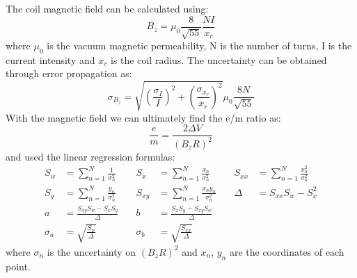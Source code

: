 The coil magnetic field can be calculated using:
\begin{equation*}
    B_z=\mu_0\frac{8}{\sqrt{55}}\frac{NI}{x_r}
\end{equation*}
where $\mu_0$ is the vacuum magnetic permeability, N is the number of turns, I is the current intensity and $x_r$ is the coil radius. The uncertainty can be obtained through error propagation as:
\begin{equation*}
    \sigma_{B_z}=\sqrt{(\frac{\sigma_I}{I})^2+(\frac{\sigma_{x_r}}{x_r})^2}\mu_0\frac{8N}{\sqrt{55}}
\end{equation*}
With the magnetic field we can ultimately find the e/m ratio as:
\begin{equation*}
    \frac{e}{m}=\frac{2\Delta V}{(B_zR)^2}
\end{equation*}
and used the linear regression formulas:
\begin{align*}
S_w &= \sum_{n=1}^N \frac{1}{\sigma_n^2} & \quad S_x &= \sum_{n=1}^N \frac{x_n}{\sigma_n^2} & \quad S_{xx} &= \sum_{n=1}^N \frac{x_n^2}{\sigma_n^2} \\
S_y &= \sum_{n=1}^N \frac{y_n}{\sigma_n^2} & \quad S_{xy} &= \sum_{n=1}^N \frac{x_n y_n}{\sigma_n^2}  & \quad \Delta &= S_{xx} S_w - S_x^2 \\
a &= \frac{S_{xy} S_w - S_x S_y}{\Delta} & \quad b &= \frac{S_x S_y - S_{xy} S_w}{\Delta} \\
\sigma_a &= \sqrt{\frac{S_w}{\Delta}} & \quad \sigma_b &= \sqrt{\frac{S_{xx}}{\Delta}} 
\end{align*}
where  $\sigma_n$ is the uncertainty on $(B_zR)^2$ and $x_n$,  $y_n$ are the coordinates of each point.
